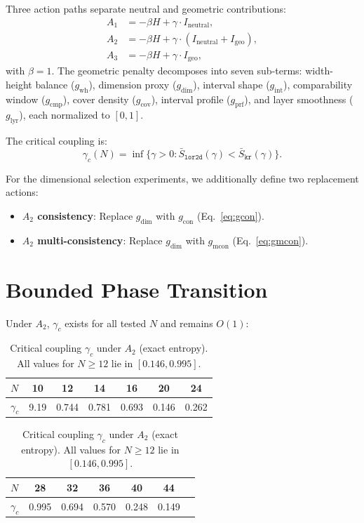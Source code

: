 \documentclass[12pt,a4paper]{article}
\begin{document}
Three action paths separate neutral and geometric contributions:
\begin{align}
    A_1 &= -\beta H + \gamma \cdot I_{\text{neutral}}, \label{eq:A1} \\
    A_2 &= -\beta H + \gamma \cdot (I_{\text{neutral}} + I_{\text{geo}}),
    \label{eq:A2} \\
    A_3 &= -\beta H + \gamma \cdot I_{\text{geo}}, \label{eq:A3}
\end{align}
with $\beta = 1$. The geometric penalty decomposes into seven sub-terms:
width-height balance ($g_{\text{wh}}$), dimension proxy ($g_{\text{dim}}$),
interval shape ($g_{\text{int}}$), comparability window ($g_{\text{cmp}}$),
cover density ($g_{\text{cov}}$), interval profile ($g_{\text{prf}}$), and
layer smoothness ($g_{\text{lyr}}$), each normalized to $[0,1]$.

The critical coupling is:
\begin{equation}
    \gamma_c(N) = \inf\bigl\{\gamma > 0 :
    \bar{S}_{\texttt{lor2d}}(\gamma) < \bar{S}_{\texttt{kr}}(\gamma)\bigr\}.
    \label{eq:gamma_c}
\end{equation}

For the dimensional selection experiments, we additionally define two
replacement actions:
\begin{itemize}[nosep]
\item \textbf{$A_2$ consistency}: Replace $g_{\text{dim}}$ with
$g_{\text{con}}$ (Eq.~\ref{eq:gcon}).
\item \textbf{$A_2$ multi-consistency}: Replace $g_{\text{dim}}$ with
$g_{\text{mcon}}$ (Eq.~\ref{eq:gmcon}).
\end{itemize}

\section{Bounded Phase Transition}
\label{sec:bounded}

Under $A_2$, $\gamma_c$ exists for all tested $N$ and remains $O(1)$:

\begin{table}[h]
\centering
\caption{Critical coupling $\gamma_c$ under $A_2$ (exact entropy). All values
for $N \geq 12$ lie in $[0.146, 0.995]$.}
\label{tab:gamma_c}
\begin{tabular}{@{}lcccccc@{}}
\toprule
$N$ & 10 & 12 & 14 & 16 & 20 & 24 \\
\midrule
$\gamma_c$ & 9.19 & 0.744 & 0.781 & 0.693 & 0.146 & 0.262 \\
\bottomrule
\end{tabular}
\medskip

\begin{tabular}{@{}lcccccc@{}}
\toprule
$N$ & 28 & 32 & 36 & 40 & 44 & \\
\midrule
$\gamma_c$ & 0.995 & 0.694 & 0.570 & 0.248 & 0.149 & \\
\bottomrule
\end{tabular}
\end{table}
\end{document}

